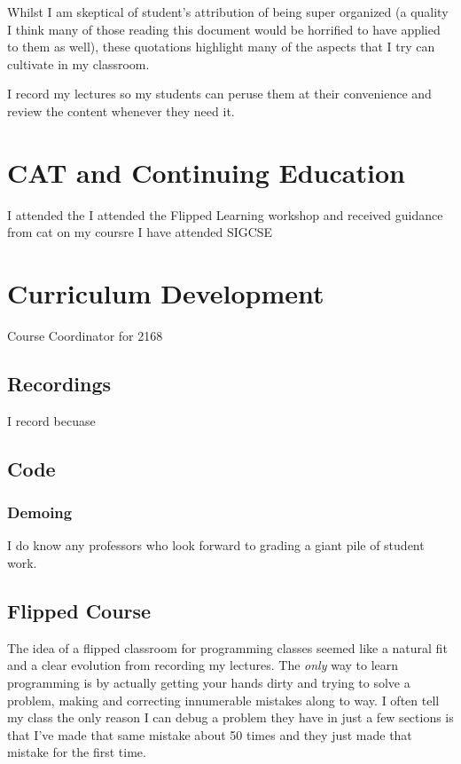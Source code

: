 \documentclass[]{article}
\begin{document}
Whilst I am skeptical of student's attribution of being super organized (a quality I think many of those reading this document would be horrified to have applied to them as well), these quotations highlight many of the aspects that I try can cultivate in my classroom.  


I record my lectures so my students can peruse them at their convenience and review the content whenever they need it.  
\section{CAT and Continuing Education}


I attended the
I attended the Flipped Learning workshop and received guidance from cat on my coursre
I have attended SIGCSE
\section{Curriculum Development}
Course Coordinator for 2168



\subsection{Recordings}

I record becuase


\subsection{Code}

\subsubsection{Demoing}
I do know any professors who look forward to grading a giant pile of student work.

\subsection{Flipped Course}
The idea of a flipped classroom for programming classes seemed like a natural fit and  a clear evolution from recording my lectures.  
The \textit{only} way to learn programming is by actually getting your hands dirty and trying to solve a problem, making and correcting innumerable mistakes along to way.  
I often tell my class the only reason I can debug a problem  they have  in just a few sections is that I've made that same mistake about 50 times and they just made that mistake for the first time.
\end{document}
